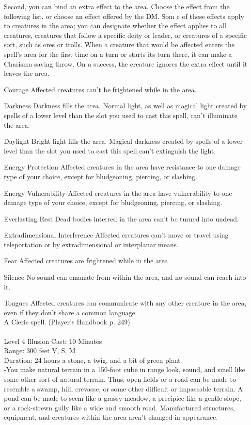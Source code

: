 \documentclass[10pt,twocolumn]{report}
\begin{document}
Second, you can bind an extra effect to the area. Choose the effect from the following list, or choose an effect offered by the DM. Som e of these effects apply to creatures in the area; you can designate whether the effect applies to all creatures, creatures that follow a specific deity or leader, or creatures of a specific sort, such as ores or trolls. When a creature that would be affected enters the spell’s area for the first time on a turn or starts its turn there, it can make a Charisma saving throw. On a success, the creature ignores the extra effect until it leaves the area.

Courage
Affected creatures can’t be frightened while in the area. 

Darkness
Darkness fills the area. Normal light, as well as magical light created by spells of a lower level than the slot you used to cast this spell, can’t illuminate the area.

Daylight
Bright light fills the area. Magical darkness created by spells of a lower level than the slot you used to cast this spell can’t extinguish the light.

Energy Protection
Affected creatures in the area have resistance to one damage type of your choice, except for bludgeoning, piercing, or slashing.

Energy Vulnerability
Affected creatures in the area have vulnerability to one damage type of your choice, except for bludgeoning, piercing, or slashing.

Everlasting Rest
Dead bodies interred in the area can’t be turned into undead.

Extradimensional Interference
Affected creatures can’t move or travel using teleportation or by extradimensional or interplanar means.

Fear
Affected creatures are frightened while in the area.

Silence
No sound can emanate from within the area, and no sound can reach into it.

Tongues
Affected creatures can communicate with any other creature in the area, even if they don’t share a common language.\\
A Cleric spell. (Player's Handbook p. 249) \\


 \\
Level 4 \quad Illusion \quad Cast: 10 Minutes\\
Range: 300 feet \quad V, S, M\\
Duration: 24 hours \quad a stone, a twig, and a bit of green plant\\
-You make natural terrain in a 150-foot cube in range look, sound, and smell like some other sort of natural terrain. Thus, open fields or a road can be made to resemble a swamp, hill, crevasse, or some other difficult or impassable terrain. A pond can be made to seem like a grassy meadow, a precipice like a gentle slope, or a rock-strewn gully like a wide and smooth road. Manufactured structures, equipment, and creatures within the area aren’t changed in appearance.
\end{document}
